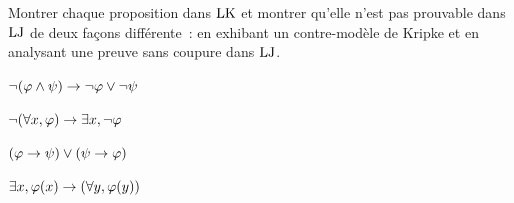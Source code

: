 \begin{exercise}
  Montrer chaque proposition dans $\operatorname{LK}$ et montrer qu'elle n'est pas prouvable
  dans $\operatorname{LJ}$ de deux façons différente~: en exhibant un contre-modèle de
  Kripke et en analysant une preuve sans coupure dans $\operatorname{LJ}$.

  \vspace{5pt}
  \begin{itemize}
    \begin{minipage}{0.45\textwidth}
    \item $\lnot(\varphi \land \psi) \to \lnot\varphi\lor\lnot\psi$
    \item $\lnot(\forall x, \varphi) \to \exists x, \lnot\varphi$
    \end{minipage}
    \begin{minipage}{0.45\textwidth}
    \item $(\varphi \to \psi) \lor (\psi\to\varphi)$
    \item $\exists x, \varphi(x) \to (\forall y, \varphi(y))$
    \end{minipage}
  \end{itemize}
\end{exercise}

